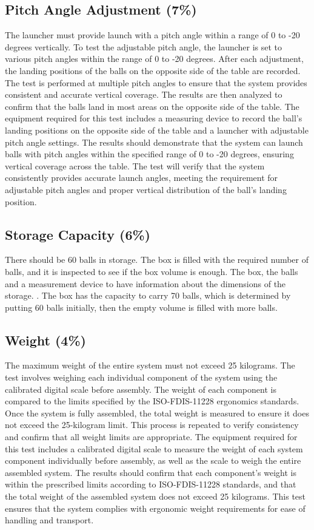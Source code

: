 \documentclass[12pt]{article}
\begin{document}
\subsection{Pitch Angle Adjustment (7\%)}
The launcher must provide launch with a pitch angle within a range of 0 to -20 degrees vertically. To test the adjustable pitch angle, the launcher is set to various pitch angles within the range of 0 to -20 degrees. After each adjustment, the landing positions of the balls on the opposite side of the table are recorded. The test is performed at multiple pitch angles to ensure that the system provides consistent and accurate vertical coverage. The results are then analyzed to confirm that the balls land in most areas on the opposite side of the table. The equipment required for this test includes a measuring device to record the ball's landing positions on the opposite side of the table and a launcher with adjustable pitch angle settings. The results should demonstrate that the system can launch balls with pitch angles within the specified range of 0 to -20 degrees, ensuring vertical coverage across the table. The test will verify that the system consistently provides accurate launch angles, meeting the requirement for adjustable pitch angles and proper vertical distribution of the ball's landing position.

\subsection{Storage Capacity (6\%)}
There should be 60 balls in storage. The box is filled with the required number of balls, and it is inspected to see if the box volume is enough. The box, the balls and a measurement device to have information about the dimensions of the storage. . The box has the capacity to carry 70 balls, which is determined by putting 60 balls initially, then the empty volume is filled with more balls.

\subsection{Weight (4\%)}
The maximum weight of the entire system must not exceed 25 kilograms. The test involves weighing each individual component of the system using the calibrated digital scale before assembly. The weight of each component is compared to the limits specified by the ISO-FDIS-11228 ergonomics standards. Once the system is fully assembled, the total weight is measured to ensure it does not exceed the 25-kilogram limit. This process is repeated to verify consistency and confirm that all weight limits are appropriate. The equipment required for this test includes a calibrated digital scale to measure the weight of each system component individually before assembly, as well as the scale to weigh the entire assembled system. The results should confirm that each component's weight is within the prescribed limits according to ISO-FDIS-11228 standards, and that the total weight of the assembled system does not exceed 25 kilograms. This test ensures that the system complies with ergonomic weight requirements for ease of handling and transport.
\end{document}
